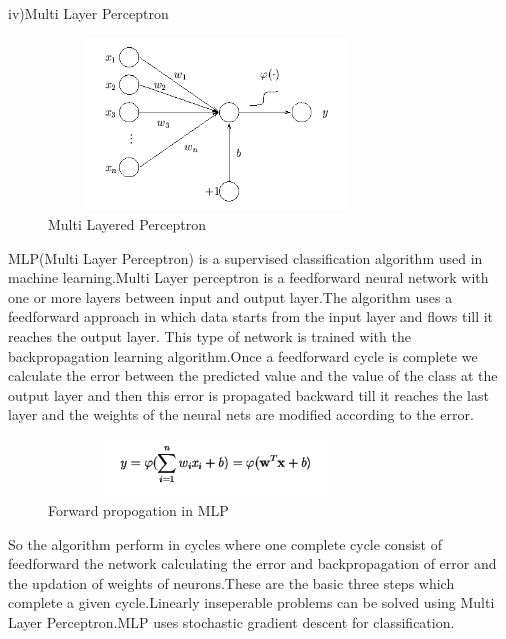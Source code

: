 \documentclass[conference,compsoc]{IEEEtran}
\begin{document}
iv)Multi Layer Perceptron
\begin{figure}[H]
\centering
\includegraphics[width=3.5in,height=1.8in]{mlp1.png}
\caption{Multi Layered Perceptron}
\label{fig_error}

\end{figure}  
\newline
\par
MLP(Multi Layer Perceptron) is a supervised classification algorithm used in machine learning.Multi Layer perceptron  is a feedforward neural network with one or more layers between input and output layer.The algorithm uses a feedforward approach in which data starts from the input layer and flows till it reaches the output layer. This type of network is trained with the backpropagation learning algorithm.Once a feedforward cycle is complete we calculate the error between the predicted value and the value of the class at the output layer and then this error is propagated backward till it reaches the last layer and the weights of the neural nets are modified according to the error.
\par
\begin{figure}[H]
\centering
\includegraphics[width=3.5in,height=0.6in]{mlp2.png}
\caption{Forward propogation in MLP}
\label{fig_error}

\end{figure}  
So the algorithm perform in cycles where one complete cycle consist of feedforward the network calculating the error and backpropagation of error and the updation of weights of neurons.These are the basic three steps which complete a given cycle.Linearly inseperable problems can be solved using Multi Layer Perceptron.MLP uses stochastic gradient descent for classification.
\newline
\end{document}
